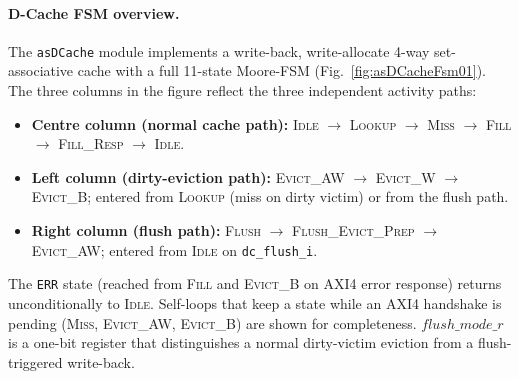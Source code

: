 
\paragraph{D-Cache FSM overview.}
The \texttt{asDCache} module implements a write-back, write-allocate
4-way set-associative cache with a full 11-state Moore-FSM
(Fig.~\ref{fig:asDCacheFsm01}).
The three columns in the figure reflect the three independent activity
paths:

\begin{itemize}
  \item \textbf{Centre column (normal cache path):}
    \textsc{Idle} $\to$ \textsc{Lookup} $\to$ \textsc{Miss} $\to$
    \textsc{Fill} $\to$ \textsc{Fill\_Resp} $\to$ \textsc{Idle}.
  \item \textbf{Left column (dirty-eviction path):}
    \textsc{Evict\_AW} $\to$ \textsc{Evict\_W} $\to$ \textsc{Evict\_B};
    entered from \textsc{Lookup} (miss on dirty victim) or from the
    flush path.
  \item \textbf{Right column (flush path):}
    \textsc{Flush} $\to$ \textsc{Flush\_Evict\_Prep} $\to$
    \textsc{Evict\_AW}; entered from \textsc{Idle} on
    \texttt{dc\_flush\_i}.
\end{itemize}

\noindent
The \texttt{ERR} state (reached from \textsc{Fill} and \textsc{Evict\_B}
on AXI4 error response) returns unconditionally to \textsc{Idle}.
Self-loops that keep a state while an AXI4 handshake is pending
(\textsc{Miss}, \textsc{Evict\_AW}, \textsc{Evict\_B}) are shown for
completeness.
$\mathit{flush\_mode\_r}$ is a one-bit register that distinguishes
a normal dirty-victim eviction from a flush-triggered write-back.

